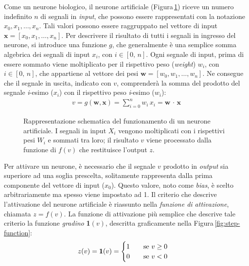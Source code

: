 Come un neurone biologico, il neurone artificiale (Figura\,\ref{fig:artificial-neuron}) riceve un numero indefinito $n$ di segnali in \textsl{input}, che possono essere rappresentati con la notazione $x_0, x_1, \dots, x_n$. Tali valori possono essere raggruppato nel vettore di input $\mathbf{x} = \left[x_0, x_1, \dots, x_n\right]$. Per descrivere il risultato di tutti i segnali in ingresso del neurone, si introduce una funzione $g$, che generalmente è una semplice somma algebrica dei segnali di input $x_i$, con $i\in[0,\,n]$. Ogni segnale di input, prima di essere sommato viene moltiplicato per il rispettivo peso (\textit{weight}) $w_i$, con $i\in[0,\,n]$, che appartiene al vettore dei pesi $\mathbf{w} = \left[w_0, w_1, \dots, w_n \right]$. Ne consegue che il segnale in uscita, indicato con $v$, comprenderà la somma del prodotto del segnale \textit{i}-esimo ($x_i$) con il rispettivo peso \textit{i}-esimo ($w_i$):
% 
\begin{gather}
    v = g\left(\mathbf{w}, \mathbf{x}\right) = \sum_{i = 0}^n w_i\,x_i = \mathbf{w}\,\cdot\,\mathbf{x}
    \label{eq:algebric-sum}
\end{gather}
% 
\begin{figure}[!b]
    \centering
    
    \caption[Rappresentazione schematica del funzionamento di un neurone artificiale.]{Rappresentazione schematica del funzionamento di un neurone artificiale. I segnali in input $X_i$ vengono moltiplicati con i rispettivi pesi $W_i$ e sommati tra loro; il risultato $v$ viene processato dalla funzione di $f(v)$ che restituisce l'output $z$.}\label{fig:artificial-neuron}
\end{figure}
% 
\noindent Per attivare un neurone, è necessario che il segnale $v$ prodotto in \textsl{output} sia superiore ad una soglia prescelta, solitamente rappresenta dalla prima componente del vettore di input ($x_0$). Questo valore, noto come \textit{bias}, è scelto arbitrariamente ma spesso viene impostato ad 1. Il criterio che descrive l'attivazione del neurone artificiale è riassunto nella \textsl{funzione di attivazione}, chiamata $z = f(v)$. La funzione di attivazione più semplice che descrive tale criterio la funzione \textsl{gradino} \textbf{1}$(v)$, descritta graficamente nella Figura\,\ref{fig:step-function}:
% 
\begin{gather*}
    z(v) = \text{\textbf{1}}(v) =
    \begin{cases}
        1 \hspace{20px} \text{se } v\geq0\\
        0 \hspace{20px} \text{se } v<0
    \end{cases}
\end{gather*}
